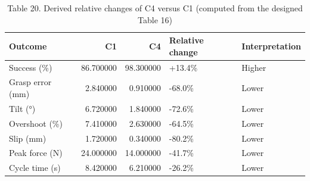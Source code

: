\begin{table}
\caption{Table 20. Derived relative changes of C4 versus C1 (computed from the designed Table 16)}
\label{tab:table20}
\begin{tabular}{lrrll}
\toprule
Outcome & C1 & C4 & Relative change & Interpretation \\
\midrule
Success (\%) & 86.700000 & 98.300000 & +13.4\% & Higher \\
Grasp error (mm) & 2.840000 & 0.910000 & -68.0\% & Lower \\
Tilt (°) & 6.720000 & 1.840000 & -72.6\% & Lower \\
Overshoot (\%) & 7.410000 & 2.630000 & -64.5\% & Lower \\
Slip (mm) & 1.720000 & 0.340000 & -80.2\% & Lower \\
Peak force (N) & 24.000000 & 14.000000 & -41.7\% & Lower \\
Cycle time (s) & 8.420000 & 6.210000 & -26.2\% & Lower \\
\bottomrule
\end{tabular}
\end{table}
